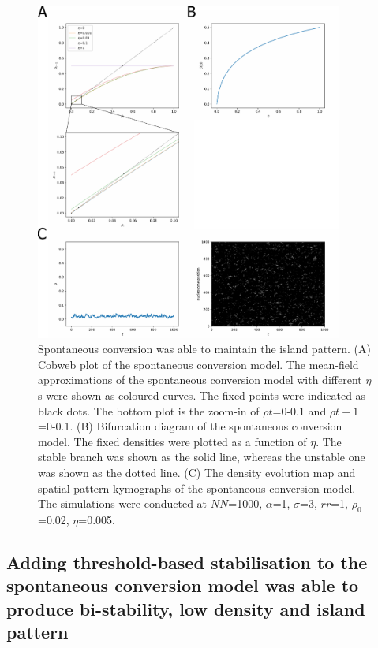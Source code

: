 \begin{figure}[htbp]
  \centering
  \includegraphics[width=0.9\textwidth]{chapter2/figures/spontaneous_conversion.pdf}
  \caption[Spontaneous conversion was able to maintain the island pattern]{Spontaneous conversion was able to maintain the island pattern. (A) Cobweb plot of the spontaneous conversion model. The mean-field approximations of the spontaneous conversion model with different $\eta$s were shown as coloured curves. The fixed points were indicated as black dots. The bottom plot is the zoom-in of $\rho{t}$=0-0.1 and $\rho{t+1}$=0-0.1. (B) Bifurcation diagram of the spontaneous conversion model. The fixed densities were plotted as a function of $\eta$. The stable branch was shown as the solid line, whereas the unstable one was shown as the dotted line. (C) The density evolution map and spatial pattern kymographs of the spontaneous conversion model. The simulations were conducted at $NN$=1000, $\alpha$=1, $\sigma$=3, $rr$=1, $\rho_{0}$=0.02, $\eta$=0.005.}
  \label{fig:spontaneousConversion}
\end{figure}

\subsection{Adding threshold-based stabilisation to the spontaneous conversion model was able to produce bi-stability, low density and island pattern}

